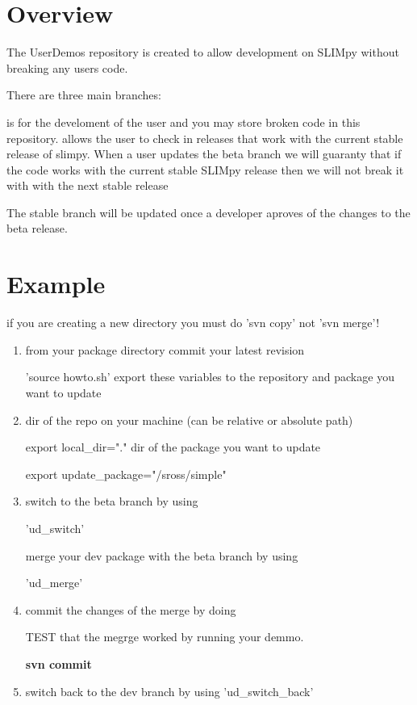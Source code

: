     \section{Overview}
    The UserDemos repository is created to allow development on SLIMpy without breaking any users code.

    There are three main branches:
	\begin{definitions} 
    	is for the develoment of the user and you may store broken code in this repository.
    	allows the user to check in releases that work with 
            the current stable release of slimpy.
            When a user updates the beta branch we will guaranty that 
            if the code works with the current stable SLIMpy release then we will not break it with
            with the next stable release
        
            The stable branch will be updated once a developer aproves of the changes to the beta release. 
	\end{definitions}

    \section{Example}
    
    \begin{notice} [note] 
    if you are creating a new directory you must do 'svn copy' not 'svn merge'! 
    \end{notice}
    \begin{enumerate}
    \item
    from your package directory commit your latest revision
    
    'source howto.sh'
    export these variables to the repository  and package you want to update
\item
    dir of the repo on your machine (can be relative or absolute path)
    
    export local_dir="." 
    dir of the package you want to update
    
    export update_package="/sross/simple" 
    
\item
    switch to the beta branch by using 
    
    'ud_switch'
    
    merge your dev package with the beta branch by using 
    
    'ud_merge'
    
    
\item
commit the changes of the merge by doing
\begin{notice} [warning] 
    TEST that the megrge worked by running your demmo.
\end{notice} 
    
    \textbf{svn commit}
\item
    switch back to the dev branch by using 'ud_switch_back' 
    \end{enumerate}


